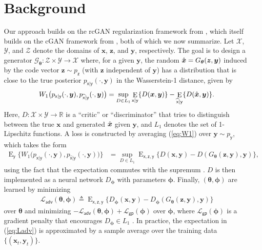 \documentclass{article}
\theoremstyle{plain}
\theoremstyle{definition}
\theoremstyle{remark}
\renewcommand{\hat}{\widehat}
\newcommand{\defn}{\triangleq}
\newcommand{\hvec}[1]{\ensuremath{\Hat{\boldsymbol{#1}}}}
\renewcommand{\vec}[1]{\ensuremath{\boldsymbol{#1}}}
\newcommand{\mc}[1]{\ensuremath{\mathcal{#1}}}
\newcommand{\Real}{{\mathbb{R}}}
\DeclareMathOperator{\E}{E}
\renewcommand{\eqref}[1]{(\ref{eq:#1})}
\newcommand{\Ladv}{\mc{L}_{\mathsf{adv}}}
\newcommand{\Lgp}{\mc{L}_{\mathsf{gp}}}
\newcommand{\py}{p_{\mathsf{y}}}
\newcommand{\pxgy}{p_{\mathsf{x}|\mathsf{y}}}
\newcommand{\pz}{p_{\mathsf{z}}}
\newcommand{\pxhgy}{p_{\hat{\mathsf{x}}|\mathsf{y}}}
\newcommand{\Ey}{\E_{\mathsf{y}}}
\newcommand{\Exgy}{\E_{\mathsf{x}|\mathsf{y}}}
\newcommand{\Exy}{\E_{\mathsf{x,y}}}
\newcommand{\Exhgy}{\E_{\hat{\mathsf{x}}|\mathsf{y}}}
\newcommand{\Egy}{\E_{\hat{\mathsf{x}},y}}
\newcommand{\Exzy}{\E_{\mathsf{x,z,y}}}
\begin{document}
\section{Background}\label{sec:background}
Our approach builds on the rcGAN regularization framework from \cite{Bendel:NIPS:23}, which itself builds on the cGAN framework from \cite{Adler:18}, both of which we now summarize.
Let $\mc{X}$, $\mc{Y}$, and $\mc{Z}$ denote the domains of $\vec{x}$, $\vec{z}$, and $\vec{y}$, respectively.
The goal is to design a generator $\mc{G}_{\vec{\theta}}:\mc{Z}\times\mc{Y}\rightarrow\mc{X}$ where, for a given $\vec{y}$, the random $\hvec{x}=G_{\vec{\theta}}(\vec{z}, \vec{y})$ induced by the code vector $\vec{z}\sim\pz$ (with $\vec{z}$ independent of $\vec{y}$) has a distribution that is close to the true posterior $\pxgy(\cdot,\vec{y})$ in the Wasserstein-1 distance, given by
\begin{align}
W_1\big(\pxgy(\cdot,\vec{y}),\pxhgy(\cdot,\vec{y})\big) = \sup_{D\in L_1} \Exgy\{D(\vec{x},\vec{y})\} - \Exhgy\{D(\hvec{x},\vec{y})\}
\label{eq:W1}.
\end{align}
Here, $D:\mc{X}\times\mc{Y}\rightarrow \Real$ is a ``critic'' or ``discriminator'' that tries to distinguish between the true $\vec{x}$ and generated $\hvec{x}$ given $\vec{y}$, and $L_1$ denotes the set of 1-Lipschitz functions.
A loss is constructed by averaging \eqref{W1} over $\vec{y}\sim\py$, which takes the form
\begin{align}
\Ey\big\{W_1\big(\pxgy(\cdot,\vec{y}),\pxhgy(\cdot,\vec{y})\big)\big\} 
&= \sup_{D\in L_1} \Exzy\{D(\vec{x},\vec{y})  - D(G_{\vec{\theta}}(\vec{z},\vec{y}),\vec{y})\}
\label{eq:EW1},
\end{align}
using the fact that the expectation commutes with the supremum \cite{Adler:18}.
$D$ is then implemented as a neural network $D_{\vec{\phi}}$ with parameters $\vec{\phi}$.
Finally, $(\vec{\theta}, \vec{\phi})$ are learned by minimizing
\begin{align}
\Ladv(\vec{\theta},\vec{\phi}) 
\defn \Exzy\{D_{\vec{\phi}}(\vec{x},\vec{y}) - D_{\vec{\phi}}(G_{\vec{\theta}}(\vec{z},\vec{y}),\vec{y})\}
\label{eq:Ladv} 
\end{align}
over $\vec{\theta}$ and minimizing $-\Ladv(\vec{\theta},\vec{\phi}) + \Lgp(\vec{\phi})$ over $\vec{\phi}$, where $\Lgp(\vec{\phi})$ is a gradient penalty that encourages $D_{\vec{\phi}}\in L_1$ \cite{Gulrajani:NIPS:17}.
In practice, the expectation in \eqref{Ladv} is approximated by a sample average over the training data $\{(\vec{x}_t,\vec{y}_t)\}$.
\end{document}
